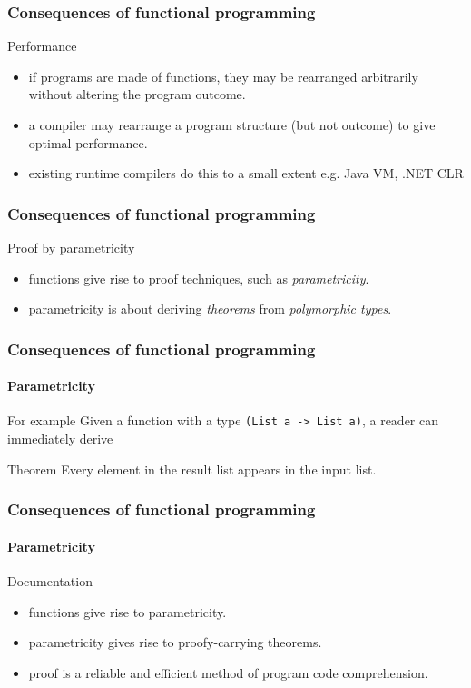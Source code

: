 \begin{frame}
\frametitle{Consequences of functional programming}
\begin{block}{Performance}
\begin{itemize}
\item<1-> if programs are made of functions, they may be rearranged arbitrarily without altering the program outcome.
\item<2-> a compiler may rearrange a program structure (but not outcome) to give optimal performance.
\item<3-> existing runtime compilers do this to a small extent e.g. Java VM, .NET CLR
\end{itemize}
\end{block}
\end{frame}

\begin{frame}
\frametitle{Consequences of functional programming}
\begin{block}{Proof by parametricity \cite{wadler1989theorems}}
\begin{itemize}
\item<1-> functions give rise to proof techniques, such as \emph{parametricity}.
\item<2-> parametricity is about deriving \emph{theorems} from \emph{polymorphic types}.
\end{itemize}
\end{block}
\end{frame}

\begin{frame}
\frametitle{Consequences of functional programming}
\framesubtitle{Parametricity}
\begin{block}{For example}
Given a function with a type \lstinline{(List a -> List a)}, a reader can immediately derive
\end{block}
\begin{block}{Theorem}
Every element in the result list appears in the input list.
\end{block}

\end{frame}

\begin{frame}
\frametitle{Consequences of functional programming}
\framesubtitle{Parametricity}
\begin{block}{Documentation}
\begin{itemize}
\item <1-> functions give rise to parametricity.
\item <2-> parametricity gives rise to proofy-carrying theorems.
\item <3-> proof is a reliable and efficient method of program code comprehension.
\end{itemize}
\end{block}
\end{frame}

